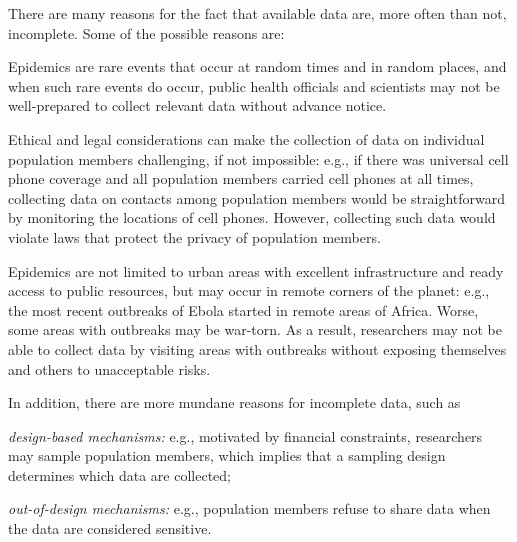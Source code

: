 There are many reasons for the fact that available data are,
more often than not,
incomplete.
Some of the possible reasons are:
\bi
\item Epidemics are rare events that occur at random times and in random places,
and when such rare events do occur,
public health officials and scientists may not be well-prepared to collect relevant data without advance notice.
\item Ethical and legal considerations can make the collection of data on individual population members challenging,
if not impossible:
e.g.,
if there was universal cell phone coverage and all population members carried cell phones at all times,
collecting data on contacts among population members would be straightforward by monitoring the locations of cell phones.
However,
collecting such data would violate laws that protect the privacy of population members.
\item Epidemics are not limited to urban areas with excellent infrastructure and ready access to public resources,
but may occur in remote corners of the planet:
e.g.,
the most recent outbreaks of Ebola started in remote areas of Africa.
Worse,
some areas with outbreaks may be war-torn.
As a result,
researchers may not be able to collect data by visiting areas with outbreaks without exposing themselves and others to unacceptable risks.
\item In addition, 
there are more mundane reasons for incomplete data,
such as
\bi
\item[---] {\em design-based mechanisms:} 
e.g.,
motivated by financial constraints,
researchers may sample population members, 
which implies that a sampling design determines which data are collected;
\item[---] {\em out-of-design mechanisms:} 
e.g.,
population members refuse to share data when the data are considered sensitive.
\ei
\ei
